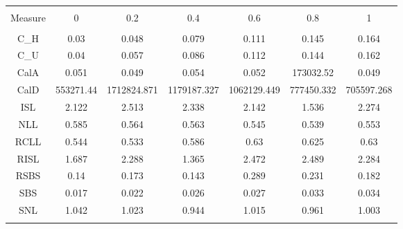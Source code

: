 
\begin{table}[!htbp] \centering 
  \caption{} 
  \label{} 
\begin{tabular}{@{\extracolsep{5pt}} ccccccc} 
\\[-1.8ex]\hline 
\hline \\[-1.8ex] 
Measure & 0 & 0.2 & 0.4 & 0.6 & 0.8 & 1 \\ 
\hline \\[-1.8ex] 
C\_H & 0.03 & 0.048 & 0.079 & 0.111 & 0.145 & 0.164 \\ 
C\_U & 0.04 & 0.057 & 0.086 & 0.112 & 0.144 & 0.162 \\ 
CalA & 0.051 & 0.049 & 0.054 & 0.052 & 173032.52 & 0.049 \\ 
CalD & 553271.44 & 1712824.871 & 1179187.327 & 1062129.449 & 777450.332 & 705597.268 \\ 
ISL & 2.122 & 2.513 & 2.338 & 2.142 & 1.536 & 2.274 \\ 
NLL & 0.585 & 0.564 & 0.563 & 0.545 & 0.539 & 0.553 \\ 
RCLL & 0.544 & 0.533 & 0.586 & 0.63 & 0.625 & 0.63 \\ 
RISL & 1.687 & 2.288 & 1.365 & 2.472 & 2.489 & 2.284 \\ 
RSBS & 0.14 & 0.173 & 0.143 & 0.289 & 0.231 & 0.182 \\ 
SBS & 0.017 & 0.022 & 0.026 & 0.027 & 0.033 & 0.034 \\ 
SNL & 1.042 & 1.023 & 0.944 & 1.015 & 0.961 & 1.003 \\ 
\hline \\[-1.8ex] 
\end{tabular} 
\end{table} 
